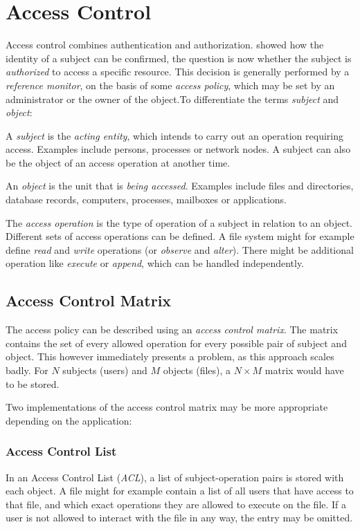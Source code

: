 \chapter{Access Control}
Access control combines authentication and authorization.
 showed how the identity of a subject can be
confirmed, the question is now whether the subject is \emph{authorized} to
access a specific resource. This decision is generally performed by a
\emph{reference monitor}, on the basis of some \emph{access policy}, which may
be set by an administrator or the owner of the object.To differentiate the terms
\textit{subject} and \textit{object}:

A \emph{subject} is the \textit{acting entity}, which intends to carry out an
operation requiring access. Examples include persons, processes or network
nodes. A subject can also be the object of an access operation at another time.

An \emph{object} is the unit that is \textit{being accessed}. Examples include
files and directories, database records, computers, processes, mailboxes or
applications.

The \emph{access operation} is the type of operation of a subject in relation to
an object. Different sets of access operations can be defined. A file system
might for example define \textit{read} and \textit{write} operations (or
\textit{observe} and \textit{alter}). There might be additional operation like
\textit{execute} or \textit{append}, which can be handled independently.

\section{Access Control Matrix}
The access policy can be described using an \textit{access control matrix}. The
matrix contains the set of every allowed operation for every possible pair of
subject and object. This however immediately presents a problem, as this
approach scales badly. For $N$ subjects (users) and $M$ objects (files), a $N
\times M$ matrix would have to be stored.

Two implementations of the access control matrix may be more appropriate
depending on the application:

\subsection{Access Control List}
In an Access Control List (\textit{ACL}), a list of subject-operation pairs is
stored with each object. A file might for example contain a list of all users
that have access to that file, and which exact operations they are allowed to
execute on the file. If a user is not allowed to interact with the file in any
way, the entry may be omitted.

